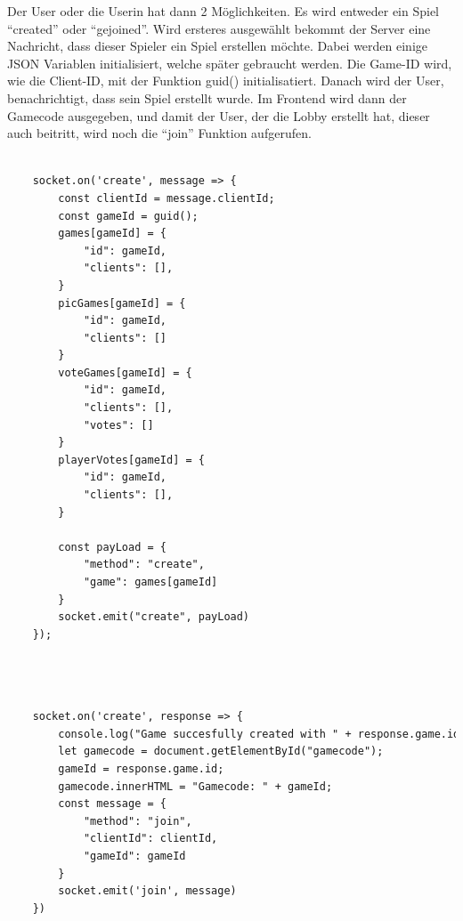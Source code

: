 Der User oder die Userin hat dann 2 Möglichkeiten. Es wird entweder ein Spiel ``created'' oder ``gejoined''.
Wird ersteres ausgewählt bekommt der Server eine Nachricht, dass dieser Spieler ein Spiel erstellen möchte.
Dabei werden einige JSON Variablen initialisiert, welche später gebraucht werden. Die Game-ID wird, wie die Client-ID,
mit der Funktion guid() initialisatiert. Danach wird der User, benachrichtigt, dass sein Spiel erstellt wurde. Im Frontend wird dann der Gamecode ausgegeben, und
damit der User, der die Lobby erstellt hat, dieser auch beitritt, wird noch die ``join'' Funktion aufgerufen.
\begin{lstlisting}[language=html,caption=Create Game Server]
    
    socket.on('create', message => {
        const clientId = message.clientId;
        const gameId = guid();
        games[gameId] = {
            "id": gameId,
            "clients": [],
        }
        picGames[gameId] = {
            "id": gameId,
            "clients": []
        }
        voteGames[gameId] = {
            "id": gameId,
            "clients": [],
            "votes": []
        }
        playerVotes[gameId] = {
            "id": gameId,
            "clients": [],
        }

        const payLoad = {
            "method": "create",
            "game": games[gameId]
        }
        socket.emit("create", payLoad)
    });

    


\end{lstlisting}
\begin{lstlisting}[language=html,caption=Create Game Client]

    socket.on('create', response => {
        console.log("Game succesfully created with " + response.game.id);
        let gamecode = document.getElementById("gamecode");
        gameId = response.game.id;
        gamecode.innerHTML = "Gamecode: " + gameId;
        const message = {
            "method": "join",
            "clientId": clientId,
            "gameId": gameId
        }
        socket.emit('join', message)
    })

\end{lstlisting}


